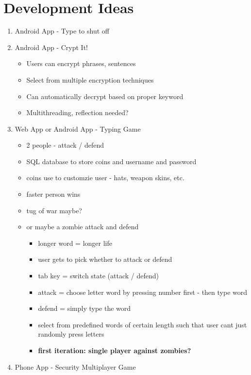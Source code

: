 \documentclass[10pt]{article}
\begin{document}
\section*{Development Ideas}
\begin{enumerate}
    \item Android App - Type to shut off
    \item Android App - Crypt It!
    \begin{itemize}
        \item Users can encrypt phrases, sentences
        \item Select from multiple encryption techniques
        \item Can automatically decrypt based on proper keyword
        \item Multithreading, reflection needed?
    \end{itemize}
    \item Web App or Android App - Typing Game
    \begin{itemize}
        \item 2 people - attack / defend
        \item SQL database to store coins and username and password
        \item coins use to customzie user - hats, weapon skins, etc.
        \item faster person wins
        \item tug of war maybe?
        \item or maybe a zombie attack and defend
        \begin{itemize}
            \item longer word = longer life
            \item user gets to pick whether to attack or defend
            \item tab key = switch state (attack / defend)
            \item attack = choose letter word by pressing number first - then type word
            \item defend = simply type the word
            \item select from predefined words of certain length such that user cant just randomly press letters
            \item \textbf{first iteration: single player against zombies?}
        \end{itemize}
    \end{itemize}
    \item Phone App - Security Multiplayer Game

\end{enumerate}
\end{document}

